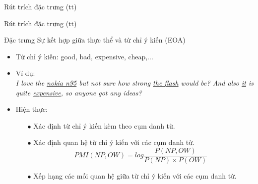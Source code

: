 \documentclass[9pt,xcolor=table,hyperref=unicode]{beamer}
\begin{document}
	\begin{frame}{Rút trích đặc trưng (tt)}		
		\begin{table}[]		
		\parbox{\textwidth}{
			\centering			
			\fontsize{8pt}{10}\selectfont		
				
			\caption{Các đặc trưng được sử dụng trong hệ thống \footnotemark \textsuperscript{,} \footnotemark}
		}
		\end{table}					
	\end{frame}	

	\begin{frame}{Rút trích đặc trưng (tt)}
		\begin{block}{Đặc trưng Sự kết hợp giữa thực thể và từ chỉ ý kiến (EOA)}
			\begin{itemize}			
				\item{Từ chỉ ý kiến: good, bad, expensive, cheap,...}
				\item{Ví dụ:\\
					\textit{I love the \underline{nokia n95} but not sure how strong \underline{the flash} would be? And also \underline{it} is quite \underline{expensive}, so anyone got any ideas?}}
				\item{Hiện thực:
					\begin{itemize}
						\itemsep0.8em
						\item[$\bullet$]{Xác định từ chỉ ý kiến kèm theo cụm danh từ.}
						\item[$\bullet$]{Xác định quan hệ từ chỉ ý kiến với các cụm danh từ. 
							\begin{equation*}
							PMI(NP,OW) = log\frac{P(NP,OW)}{P(NP)\times P(OW)}
							\end{equation*}
						}				
						\item[$\bullet$]{Xếp hạng các mối quan hệ giữa từ chỉ ý kiến với các cụm danh từ.}			
					\end{itemize}
				}
			\end{itemize}
		\end{block}	
	\end{frame}
\end{document}

